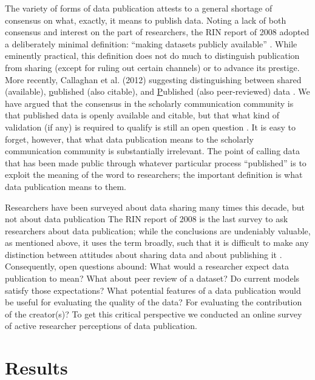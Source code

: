 \documentclass[10pt]{article}
\begin{document}
The variety of forms of data publication attests to a general shortage of consensus on what, exactly, it means to publish data.
Noting a lack of both consensus and interest on the part of researchers, the RIN report of 2008 adopted a deliberately minimal definition: ``making datasets publicly available'' \cite{swan_share_2008}.
While eminently practical, this definition does not do much to distinguish publication from sharing (except for ruling out certain channels) or to advance its prestige.
More recently, Callaghan et al. (2012) suggesting distinguishing between shared (available), \underline{p}ublished (also citable), and \underline{P}ublished (also peer-reviewed) data \cite{callaghan_making_2012}.
We have argued that the consensus in the scholarly communication community is that published data is openly available and citable, but that what kind of validation (if any) is required to qualify is still an open question \cite{kratz_data_2014}.
It is easy to forget, however, that what data publication means to the scholarly communication community is substantially irrelevant.
The point of calling data that has been made public through whatever particular process ``published'' is to exploit the meaning of the word to researchers; the important definition is what data publication means to them. 

Researchers have been surveyed about data sharing many times this decade, but not about data publication \cite{harley_assessing_2010, westra_data_2010, tenopir_data_2011, kim_institutional_2012, scaramozzino_study_2012, williams_gathering_2013, bobrow_establishing_2014, strasser_dataup:_2014}
The RIN report of 2008 is the last survey to ask researchers about data publication; while the conclusions are undeniably valuable, as mentioned above, it uses the term broadly, such that it is difficult to make any distinction between attitudes about sharing data and about publishing it \cite{swan_share_2008}.
Consequently, open questions abound:
What would a researcher expect data publication to mean?
What about peer review of a dataset?
Do current models satisfy those expectations?
What potential features of a data publication would be useful for evaluating the quality of the data?
For evaluating the contribution of the creator(s)?
To get this critical perspective we conducted an online survey of active researcher perceptions of data publication.


\section*{Results}
\end{document}
